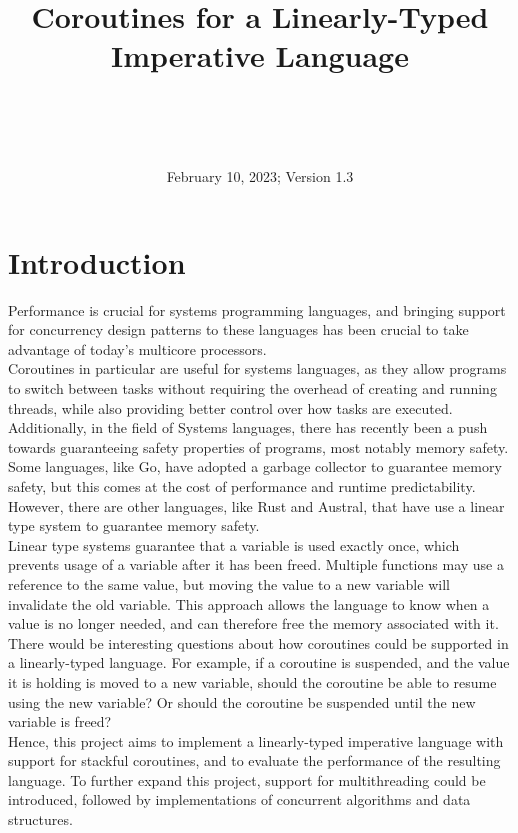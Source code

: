 \documentclass[publish, nobox]{acmconf}
\begin{document}
\date{February 10, 2023; Version 1.3}
\title{Coroutines for a Linearly-Typed Imperative Language}
\author{\\
    \\
    \\
}
\maketitle
\section*{Introduction}
Performance is crucial for systems programming languages, and bringing support for concurrency design patterns to these languages has been crucial to take advantage of today's multicore processors. \\
Coroutines in particular are useful for systems languages, as they allow programs to switch between tasks without requiring the overhead of creating and running threads, while also providing better control over how tasks are executed. \\
Additionally, in the field of Systems languages, there has recently been a push towards guaranteeing safety properties of programs, most notably memory safety. Some languages, like Go, have adopted a garbage collector to guarantee memory safety, but this comes at the cost of performance and runtime predictability. However, there are other languages, like Rust and Austral, that have use a linear type system to guarantee memory safety. \\
Linear type systems guarantee that a variable is used exactly once, which prevents usage of a variable after it has been freed. Multiple functions may use a reference to the same value, but moving the value to a new variable will invalidate the old variable. This approach allows the language to know when a value is no longer needed, and can therefore free the memory associated with it. \\
There would be interesting questions about how coroutines could be supported in a linearly-typed language. For example, if a coroutine is suspended, and the value it is holding is moved to a new variable, should the coroutine be able to resume using the new variable? Or should the coroutine be suspended until the new variable is freed? \\
Hence, this project aims to implement a linearly-typed imperative language with support for stackful coroutines, and to evaluate the performance of the resulting language. To further expand this project, support for multithreading could be introduced, followed by implementations of concurrent algorithms and data structures.
\end{document}
